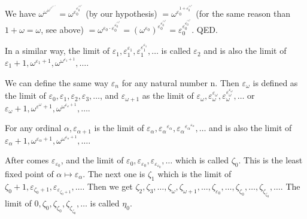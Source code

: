 \documentclass[10pt]{article}
\begin{document}
We have \( \omega^{\omega^{\omega^{\vdots^{\omega^{\omega^{\varepsilon_0+1}}}}}} = \omega^{\varepsilon_0^{\varepsilon_0^{\vdots^{{\varepsilon_0}^\omega}}}} \) (by our hypothesis) \( = \omega^{\varepsilon_0^{1+\varepsilon_0^{\vdots^{{\varepsilon_0}^\omega}}}} \) (for the same reason than \( 1+\omega = \omega \), see above) \( = \omega^{\varepsilon_0\cdot\varepsilon_0^{\varepsilon_0^{\vdots^{{\varepsilon_0}^\omega}}}} = (\omega^{\varepsilon_0})^{\varepsilon_0^{\varepsilon_0^{\vdots^{{\varepsilon_0}^\omega}}}} = \varepsilon_0^{\varepsilon_0^{\varepsilon_0^{\vdots^{{\varepsilon_0}^\omega}}}} \). QED.


In a similar way, the limit of \( \varepsilon_1, \varepsilon_1^{\varepsilon_1}, \varepsilon_1^{\varepsilon_1^{\varepsilon_1}}, \ldots \) is called \( \varepsilon_2 \) and is also the limit of \( \varepsilon_1+1, \omega^{\varepsilon_1+1}, \omega^{\omega^{\varepsilon_1+1}}, \ldots \).

We can define the same way \( \varepsilon_n \) for any natural number n. Then \( \varepsilon_\omega \) is defined as the limit of \( \varepsilon_0, \varepsilon_1, \varepsilon_2, \varepsilon_3, \ldots \), and \( \varepsilon_{\omega+1} \) as the limit of \( \varepsilon_\omega, \varepsilon_\omega^{\varepsilon_\omega}, \varepsilon_\omega^{\varepsilon_\omega^{\varepsilon_\omega}}, \ldots \) or \( \varepsilon_\omega+1, \omega^{\varepsilon^\omega+1}, \omega^{\omega^{\varepsilon_\omega+1}}, \ldots \).

For any ordinal \( \alpha, \varepsilon_{\alpha+1} \) is the limit of \( \varepsilon_\alpha, {\varepsilon_\alpha}^{\varepsilon_\alpha}, {\varepsilon_\alpha}^{{\varepsilon_\alpha}^{\varepsilon_\alpha}}, \ldots \) and is also the limit of \( \varepsilon_\alpha+1, \omega^{\varepsilon_\alpha+1}, \omega^{\omega^{\varepsilon_\alpha+1}}, \ldots \).

After comes \( \varepsilon_{\varepsilon_0} \), and the limit of \( \varepsilon_0, \varepsilon_{\varepsilon_0}, \varepsilon_{\varepsilon_{\varepsilon_0}}, \ldots \) which is called \( \zeta_0 \). 
This is the least fixed point of \( \alpha \mapsto \varepsilon_\alpha \). The next one is \( \zeta_1 \) which is the limit of \( \zeta_0+1, \varepsilon_{\zeta_0+1}, \varepsilon_{\varepsilon_{\zeta_0+1}}, \ldots \). 
Then we get \( \zeta_2, \zeta_3, \ldots, \zeta_\omega, \zeta_{\omega+1}, \ldots, \zeta_{\varepsilon_0}, \ldots, \zeta_{\zeta_0}, \ldots, \zeta_{\zeta_{\zeta_0}}, \ldots \).
The limit of \( 0, \zeta_0, \zeta_{\zeta_0}, \zeta_{\zeta_{\zeta_0}}, \ldots \) is called \( \eta_0 \). 
\end{document}
